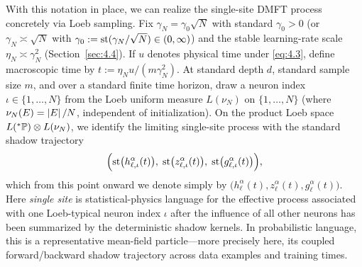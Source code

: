 With this notation in place, we can realize the single-site DMFT process concretely via Loeb sampling. Fix $\gamma_N = \gamma_0 \sqrt{N}$ with standard $\gamma_0 > 0$ (or $\gamma_N \asymp \sqrt{N}$ with $\gamma_0 := \operatorname{st}(\gamma_N / \sqrt{N}) \in (0, \infty)$) and the stable learning-rate scale $\eta_N \asymp \gamma_N^2$ (Section~\ref{sec:4.4}). If $u$ denotes physical time under \eqref{eq:4.3}, define macroscopic time by $t := \eta_N u / (m\gamma_N^2)$. At standard depth $d$, standard sample size $m$, and over a standard finite time horizon, draw a neuron index $\iota \in \{1, \dots, N\}$ from the Loeb uniform measure $L(\nu_N)$ on $\{1, \dots, N\}$ (where $\nu_N(E) = \left\lvert E \right\rvert/N$, independent of initialization). On the product Loeb space $L({}^*\mathbb{P}) \otimes L(\nu_N)$, we identify the limiting single-site process \cite[Eqs.~(9)--(10)]{bordelon2022self} with the standard shadow trajectory
\[
\Bigl(\operatorname{st}\bigl(h_{\ell, \iota}^\alpha(t)\bigr),\; \operatorname{st}\bigl(z_{\ell, \iota}^\alpha(t)\bigr),\; \operatorname{st}\bigl(g_{\ell, \iota}^\alpha(t)\bigr)\Bigr),
\]
which from this point onward we denote simply by $\bigl(h_\ell^\alpha(t), z_\ell^\alpha(t), g_\ell^\alpha(t)\bigr)$. Here \emph{single site} is statistical-physics language for the effective process associated with one Loeb-typical neuron index $\iota$ after the influence of all other neurons has been summarized by the deterministic shadow kernels. In probabilistic language, this is a representative mean-field particle---more precisely here, its coupled forward/backward shadow trajectory across data examples and training times.

